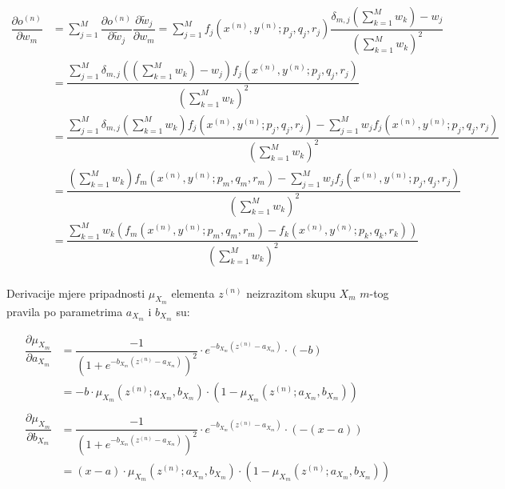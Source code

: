\documentclass[12pt, a4paper]{article}
\begin{document}
\begin{align*}
  \dfrac{\partial o^{(n)}}{\partial w_m} &=
  \sum_{j=1}^{M} \dfrac{\partial o^{(n)}}{\partial \widetilde{w}_j}
    \dfrac{\partial\widetilde{w}_j}{\partial w_m} =
  \sum_{j=1}^{M} f_j  \left( x^{(n)}, y^{(n)}; p_j, q_j, r_j \right)
  \dfrac{ \delta_{m, j} \left(\sum_{k=1}^{M} w_k \right) - w_j}{\left( \sum_{k=1}^{M} w_k \right)^2} \\
  &= \dfrac{
     \sum_{j=1}^{M} \delta_{m, j} \left( \left(\sum_{k=1}^{M} w_k \right) - w_j \right)
     f_j  \left( x^{(n)}, y^{(n)}; p_j, q_j, r_j \right)}
     {\left( \sum_{k=1}^{M} w_k \right)^2} \\
  &= \dfrac{
    \sum_{j=1}^{M} \delta_{m, j} \left(\sum_{k=1}^{M} w_k \right)
    f_j \left( x^{(n)}, y^{(n)}; p_j, q_j, r_j \right)
    - \sum_{j=1}^{M} w_j f_j \left( x^{(n)}, y^{(n)}; p_j, q_j, r_j \right)}
  {\left( \sum_{k=1}^{M} w_k \right)^2} \\
  &= \dfrac{
    \left(\sum_{k=1}^{M} w_k \right)
    f_m \left( x^{(n)}, y^{(n)}; p_m, q_m, r_m \right)
    - \sum_{j=1}^{M} w_j f_j \left( x^{(n)}, y^{(n)}; p_j, q_j, r_j \right)}
  {\left( \sum_{k=1}^{M} w_k \right)^2} \\
  &= \dfrac{
    \sum_{k=1}^{M} w_k
    \left( f_m \left( x^{(n)}, y^{(n)}; p_m, q_m, r_m \right)
    - f_k \left( x^{(n)}, y^{(n)}; p_k, q_k, r_k \right)\right)}
  {\left( \sum_{k=1}^{M} w_k \right)^2} \\
\end{align*}

Derivacije mjere pripadnosti $\mu_{X_m}$ elementa $z^{(n)}$ neizrazitom skupu $X_m$ $m$-tog pravila po parametrima $a_{X_m}$ i $b_{X_m}$ su:

\begin{align*}
  \dfrac{\partial \mu_{X_m}}{\partial a_{X_m}}
  &= \dfrac{-1}{\left( 1 + e^{-b_{X_m}\left( z^{(n)} - a_{X_m} \right)} \right)^2} \cdot
    e^{-b_{X_m}\left( z^{(n)} - a_{X_m} \right)} \cdot (-b) \\
  &= -b \cdot \mu_{X_m} \left( z^{(n)}; a_{X_m}, b_{X_m} \right) \cdot \left( 1 - \mu_{X_m} \left( z^{(n)}; a_{X_m}, b_{X_m} \right) \right) \\ \\
  \dfrac{\partial \mu_{X_m}}{\partial b_{X_m}}
  &= \dfrac{-1}{\left( 1 + e^{-b_{X_m}\left( z^{(n)} - a_{X_m} \right)} \right)^2} \cdot
  e^{-b_{X_m}\left( z^{(n)} - a_{X_m} \right)} \cdot (-(x - a)) \\
  &= (x - a) \cdot \mu_{X_m} \left( z^{(n)}; a_{X_m}, b_{X_m} \right) \cdot \left( 1 - \mu_{X_m} \left( z^{(n)}; a_{X_m}, b_{X_m} \right) \right)
\end{align*}
\end{document}
